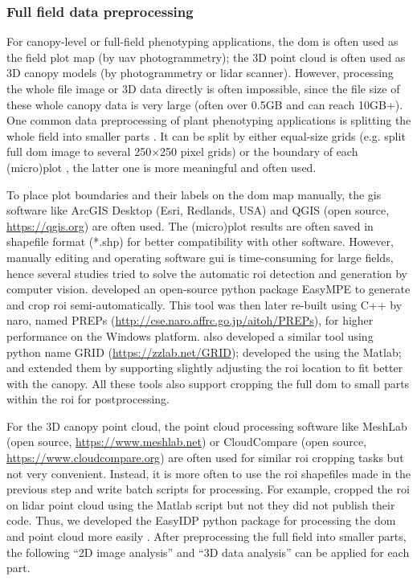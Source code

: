 \subsubsection{Full field data preprocessing}

For canopy-level or full-field phenotyping applications, the \gls{dom} is often used as the field plot map (by \gls{uav} photogrammetry); the 3D point cloud is often used as 3D canopy models (by photogrammetry or \gls{lidar} scanner). However, processing the whole file image or 3D data directly is often impossible, since the file size of these whole canopy data is very large (often over 0.5GB and can reach 10GB+). One common data preprocessing of plant phenotyping applications is splitting the whole field into smaller parts \citep{wang_easyidp_2021}. It can be split by either equal-size grids (e.g. \citet{bauer_combining_2019} split full \gls{dom} image to several 250$\times$250 pixel grids) or the boundary of each (micro)plot \citep{tresch_easympe_2019}, the latter one is more meaningful and often used.

To place plot boundaries and their labels on the \gls{dom} map manually, the \gls{gis} software like ArcGIS Desktop (Esri, Redlands, USA) and QGIS (open source, \url{https://qgis.org}) are often used. The (micro)plot results are often saved in shapefile format (*.shp) for better compatibility with other software. However, manually editing and operating software \gls{gui} is time-consuming for large fields, hence several studies tried to solve the automatic \gls{roi} detection and generation by computer vision. \citep{tresch_easympe_2019} developed an open-source python package EasyMPE to generate and crop \gls{roi} semi-automatically. This tool was then later re-built using C++ by \gls{naro}, named PREPs (\url{http://cse.naro.affrc.go.jp/aitoh/PREPs}), for higher performance on the Windows platform. \citet{chen_grid_2020} also developed a similar tool using python name GRID (\url{https://zzlab.net/GRID}); \citet{mortensen_drone_2019} developed the using the Matlab; and \citep{sara_automatic_2021} extended them by supporting slightly adjusting the \gls{roi} location to fit better with the canopy. All these tools also support cropping the full \gls{dom} to small parts within the \gls{roi} for postprocessing.

For the 3D canopy point cloud, the point cloud processing software like MeshLab (open source, \url{https://www.meshlab.net}) or CloudCompare (open source, \url{https://www.cloudcompare.org}) are often used for similar \gls{roi} cropping tasks but not very convenient. Instead, it is more often to use the \gls{roi} shapefiles made in the previous step and write batch scripts for processing. For example, \citet{sun_field_2018} cropped the \gls{roi} on \gls{lidar} point cloud using the Matlab script but not they did not publish their code. Thus, we developed the EasyIDP python package for processing the \gls{dom} and point cloud more easily \citep{wang_easyidp_2021}. After preprocessing the full field into smaller parts, the following ``2D image analysis'' and ``3D data analysis'' can be applied for each part.

